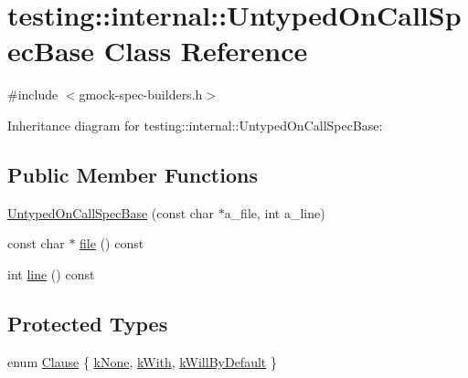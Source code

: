 \hypertarget{classtesting_1_1internal_1_1_untyped_on_call_spec_base}{}\section{testing\+:\+:internal\+:\+:Untyped\+On\+Call\+Spec\+Base Class Reference}
\label{classtesting_1_1internal_1_1_untyped_on_call_spec_base}


{\ttfamily \#include $<$gmock-\/spec-\/builders.\+h$>$}



Inheritance diagram for testing\+:\+:internal\+:\+:Untyped\+On\+Call\+Spec\+Base\+:
\subsection*{Public Member Functions}
\begin{DoxyCompactItemize}
\item 
\hyperlink{classtesting_1_1internal_1_1_untyped_on_call_spec_base_afc5da72d536ad61e2d66de87b2b9bc50}{Untyped\+On\+Call\+Spec\+Base} (const char $\ast$a\+\_\+file, int a\+\_\+line)
\item 
const char $\ast$ \hyperlink{classtesting_1_1internal_1_1_untyped_on_call_spec_base_ae4cb8eb6aa409a4b29a8cc12ec46c5c4}{file} () const 
\item 
int \hyperlink{classtesting_1_1internal_1_1_untyped_on_call_spec_base_a6cabf881d2cae1e270528a823f7d9f7e}{line} () const 
\end{DoxyCompactItemize}
\subsection*{Protected Types}
\begin{DoxyCompactItemize}
\item 
enum \hyperlink{classtesting_1_1internal_1_1_untyped_on_call_spec_base_a78ebf16bfee40375e33a983f3100f354}{Clause} \{ \hyperlink{classtesting_1_1internal_1_1_untyped_on_call_spec_base_a78ebf16bfee40375e33a983f3100f354a57f312c5eacf22518ff0b12405cde4f1}{k\+None}, 
\hyperlink{classtesting_1_1internal_1_1_untyped_on_call_spec_base_a78ebf16bfee40375e33a983f3100f354a451699b0beaaabb325f8eaf1c65a071d}{k\+With}, 
\hyperlink{classtesting_1_1internal_1_1_untyped_on_call_spec_base_a78ebf16bfee40375e33a983f3100f354aeb25a21e1aa3dc4ca3a108b5533d7eed}{k\+Will\+By\+Default}
 \}
\end{DoxyCompactItemize}
